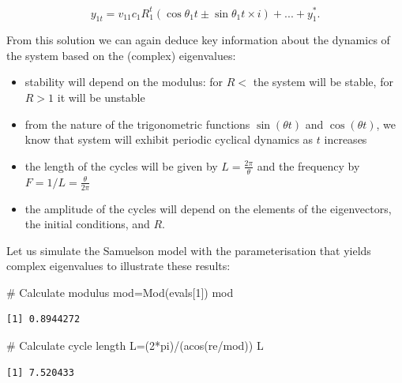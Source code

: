 \documentclass[
  letterpaper,
  DIV=11,
  numbers=noendperiod]{scrreprt}
\newenvironment{Shaded}{\begin{snugshade}}{\end{snugshade}}
\newcommand{\CommentTok}[1]{\textcolor[rgb]{0.37,0.37,0.37}{#1}}
\newcommand{\DecValTok}[1]{\textcolor[rgb]{0.68,0.00,0.00}{#1}}
\newcommand{\FunctionTok}[1]{\textcolor[rgb]{0.28,0.35,0.67}{#1}}
\newcommand{\NormalTok}[1]{\textcolor[rgb]{0.00,0.23,0.31}{#1}}
\newcommand{\OtherTok}[1]{\textcolor[rgb]{0.00,0.23,0.31}{#1}}
\newcommand{\SpecialCharTok}[1]{\textcolor[rgb]{0.37,0.37,0.37}{#1}}
\providecommand{\tightlist}{%
  \setlength{\itemsep}{0pt}\setlength{\parskip}{0pt}}\usepackage{longtable,booktabs,array}
\begin{document}
\[
y_{1t}=v_{11}c_1 R_1^t(\cos\theta_1 t \pm \sin\theta_1 t \times i) +...+ y^*_1.
\]

From this solution we can again deduce key information about the
dynamics of the system based on the (complex) eigenvalues:

\begin{itemize}
\tightlist
\item
  stability will depend on the modulus: for \(R<\) the system will be
  stable, for \(R>1\) it will be unstable
\item
  from the nature of the trigonometric functions \(\sin(\theta t)\) and
  \(\cos(\theta t)\), we know that system will exhibit periodic cyclical
  dynamics as \(t\) increases
\item
  the length of the cycles will be given by \(L=\frac{2\pi}{\theta}\)
  and the frequency by \(F=1/L=\frac{\theta}{2\pi}\)
\item
  the amplitude of the cycles will depend on the elements of the
  eigenvectors, the initial conditions, and \(R\).
\end{itemize}

Let us simulate the Samuelson model with the parameterisation that
yields complex eigenvalues to illustrate these results:

\begin{Shaded}
\begin{Highlighting}[]
\CommentTok{\# Calculate modulus}
\NormalTok{mod}\OtherTok{=}\FunctionTok{Mod}\NormalTok{(evals[}\DecValTok{1}\NormalTok{])}
\NormalTok{mod}
\end{Highlighting}
\end{Shaded}

\begin{verbatim}
[1] 0.8944272
\end{verbatim}

\begin{Shaded}
\begin{Highlighting}[]
\CommentTok{\# Calculate cycle length}
\NormalTok{L}\OtherTok{=}\NormalTok{(}\DecValTok{2}\SpecialCharTok{*}\NormalTok{pi)}\SpecialCharTok{/}\NormalTok{(}\FunctionTok{acos}\NormalTok{(re}\SpecialCharTok{/}\NormalTok{mod))}
\NormalTok{L}
\end{Highlighting}
\end{Shaded}

\begin{verbatim}
[1] 7.520433
\end{verbatim}
\end{document}
